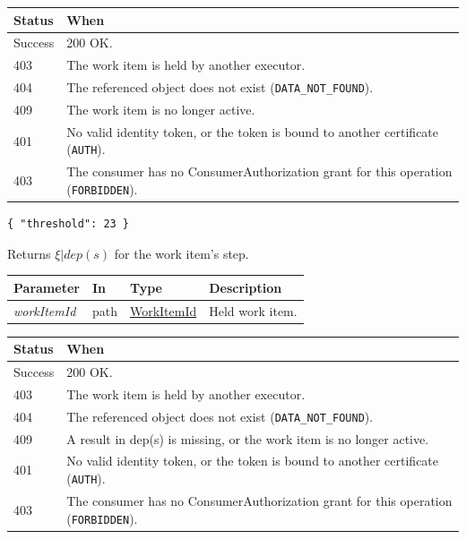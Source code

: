 \documentclass[a4paper]{arrowhead}
\newcommand{\fparam}[1]{\textit{\textcolor{ArrowheadBlue}{#1}}}
\newcommand{\pref}[1]{{\textcolor{ArrowheadGrey}{\hyperref[sec:model:primitives:#1]{#1}}}}
\begin{document}
{\small
\begin{longtable}{|p{2.0cm}|p{13.8cm}|}

\hline
\rowcolor{gray!33} Status & When \\ \hline
\endhead
Success & 200 OK. \\ \hline
403 & The work item is held by another executor. \\ \hline
404 & The referenced object does not exist (\texttt{DATA\_NOT\_FOUND}). \\ \hline
409 & The work item is no longer active. \\ \hline
401 & No valid identity token, or the token is bound to another certificate (\texttt{AUTH}). \\ \hline
403 & The consumer has no ConsumerAuthorization grant for this operation (\texttt{FORBIDDEN}). \\ \hline
\end{longtable}
}


\begin{lstlisting}[caption={Example response body}]
{ "threshold": 23 }
\end{lstlisting}

Returns $\xi|dep(s)$ for the work item's step.

{\small
\begin{longtable}{|p{3.0cm}|p{1.4cm}|p{3.2cm}|p{8.2cm}|}

\hline
\rowcolor{gray!33} Parameter & In & Type & Description \\ \hline
\endhead
\fparam{workItemId} & path & \pref{WorkItemId} & Held work item. \\ \hline
\end{longtable}
}


{\small
\begin{longtable}{|p{2.0cm}|p{13.8cm}|}

\hline
\rowcolor{gray!33} Status & When \\ \hline
\endhead
Success & 200 OK. \\ \hline
403 & The work item is held by another executor. \\ \hline
404 & The referenced object does not exist (\texttt{DATA\_NOT\_FOUND}). \\ \hline
409 & A result in dep(s) is missing, or the work item is no longer active. \\ \hline
401 & No valid identity token, or the token is bound to another certificate (\texttt{AUTH}). \\ \hline
403 & The consumer has no ConsumerAuthorization grant for this operation (\texttt{FORBIDDEN}). \\ \hline
\end{longtable}
}
\end{document}
